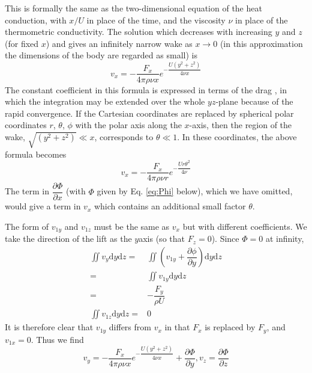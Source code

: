 \documentclass[conference]{IEEEtran}
\theoremstyle{definition}
\theoremstyle{remark}
\begin{document}
    This is formally the same as the two-dimensional equation of the heat conduction, with $x / U$ in place of the time, and the viscosity $\nu$ in place of the thermometric conductivity. The solution which decreases with increasing $y$ and $z$ (for fixed $x$) and gives an infinitely narrow wake as $x \to 0$ (in this approximation the dimensions of the body are regarded as small) is
    \begin{equation}
        v_x = -\dfrac{F_x}{4 \pi \rho \nu x} e^{-\dfrac{U(y^2+z^2)}{4\nu x}}
    \end{equation}
    The constant coefficient in this formula is expressed in terms of the drag , in which the integration may be extended over the whole $yz$-plane because of the rapid convergence. If the Cartesian coordinates are replaced by spherical polar coordinates $r$, $\theta$, $\phi$ with the polar axis along the $x$-axis, then the region of the wake, $\sqrt{(y^2 + z^2)} \ll x$, corresponds to $\theta \ll 1$. In these coordinates, the above formula becomes
    \begin{equation}
        v_x = -\dfrac{F_x}{4 \pi \rho \nu r} e^{- \dfrac{Ur\theta^2}{4\nu}}
    \end{equation}
    The term in $\dfrac{\partial \Phi}{\partial x}$ (with $\Phi$ given by Eq. \ref{eq:Phi} below), which we have omitted, would give a term in $v_x$ which contains an additional small factor $\theta$.

    The form of $v_{1y}$ and $v_{1z}$ must be the same as $v_x$ but with different coefficients. We take the direction of the lift as the $y$axis (so that $F_z = 0$). Since $\Phi = 0$ at infinity,
    \begin{align*}
        \iint v_y \mathrm{d} y \mathrm{d} z =& \iint (v_{1y} + \dfrac{\partial \phi}{\partial y}) \mathrm{d} y \mathrm{d} z \\
        =& \iint v_{1y} \mathrm{d} y \mathrm{d} z \\
        =& - \dfrac{F_y}{\rho U} \\
        \iint v_{1z} \mathrm{d} y \mathrm{d} z =& 0
    \end{align*}
    It is therefore clear that $v_{1y}$ differs from $v_{x}$ in that $F_x$ is replaced by $F_y$, and $v_{1x} = 0$. Thus we find
    \begin{equation}
        v_y = -\dfrac{F_x}{4 \pi \rho \nu x} e^{-\dfrac{U(y^2 + z^2)}{4 \nu x}} + \dfrac{\partial \Phi}{\partial y}, v_z = \dfrac{\partial \Phi}{\partial z}
    \end{equation}
\end{document}
